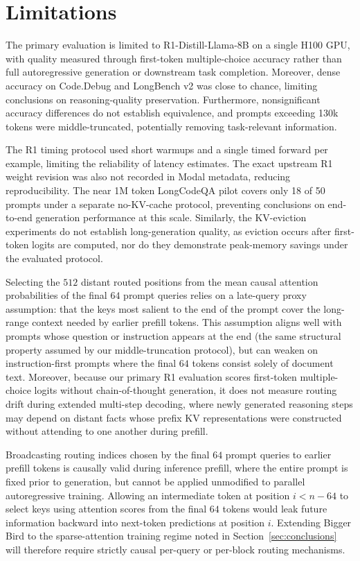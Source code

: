 \documentclass[11pt]{article}
\begin{document}
\section{Limitations}
\label{sec:limitations}

The primary evaluation is limited to R1-Distill-Llama-8B on a single H100 GPU, with quality measured through first-token multiple-choice accuracy rather than full autoregressive generation or downstream task completion. Moreover, dense accuracy on Code.Debug and LongBench v2 was close to chance, limiting conclusions on reasoning-quality preservation. Furthermore, nonsignificant accuracy differences do not establish equivalence, and prompts exceeding 130k tokens were middle-truncated, potentially removing task-relevant information. 

The R1 timing protocol used short warmups and a single timed forward per example, limiting the reliability of latency estimates. The exact upstream R1 weight revision was also not recorded in Modal metadata, reducing reproducibility. The near 1M token LongCodeQA pilot covers only 18 of 50 prompts under a separate no-KV-cache protocol, preventing conclusions on end-to-end generation performance at this scale. Similarly, the KV-eviction experiments do not establish long-generation quality, as eviction occurs after first-token logits are computed, nor do they demonstrate peak-memory savings under the evaluated protocol. 

Selecting the $512$ distant routed positions from the mean causal attention probabilities of the final $64$ prompt queries relies on a late-query proxy assumption: that the keys most salient to the end of the prompt cover the long-range context needed by earlier prefill tokens. This assumption aligns well with prompts whose question or instruction appears at the end (the same structural property assumed by our middle-truncation protocol), but can weaken on instruction-first prompts where the final $64$ tokens consist solely of document text. Moreover, because our primary R1 evaluation scores first-token multiple-choice logits without chain-of-thought generation, it does not measure routing drift during extended multi-step decoding, where newly generated reasoning steps may depend on distant facts whose prefix KV representations were constructed without attending to one another during prefill.

Broadcasting routing indices chosen by the final $64$ prompt queries to earlier prefill tokens is causally valid during inference prefill, where the entire prompt is fixed prior to generation, but cannot be applied unmodified to parallel autoregressive training. Allowing an intermediate token at position $i < n - 64$ to select keys using attention scores from the final $64$ tokens would leak future information backward into next-token predictions at position $i$. Extending Bigger Bird to the sparse-attention training regime noted in Section~\ref{sec:conclusions} will therefore require strictly causal per-query or per-block routing mechanisms.
\end{document}
